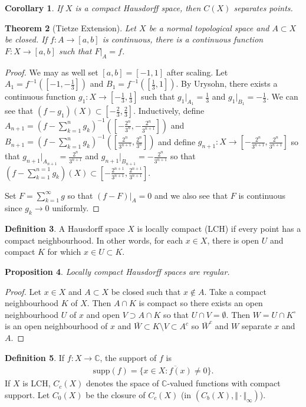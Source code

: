 \documentclass[11pt]{amsart}
\newtheorem{theorem}{Theorem}[section]
\newtheorem{proposition}[theorem]{Proposition}
\newtheorem{corollary}[theorem]{Corollary}
\theoremstyle{definition}
\newtheorem{definition}[theorem]{Definition}
\numberwithin{equation}{section}
\begin{document}
\begin{corollary}
    If $X$ is a compact Hausdorff space, then $C(X)$ separates points.
\end{corollary}
\begin{theorem}[Tietze Extension]
    Let $X$ be a normal topological space and $A\subset X$ be closed. If $f:A\to[a,b]$ is continuous, there is a continuous function $F:X\to[a,b]$ such that $F|_A=f$.
\end{theorem}
\begin{proof}
    We may as well set $[a,b]=[-1,1]$ after scaling. Let $A_1=f^{-1}([-1,-\frac{1}{3}])$ and $B_1=f^{-1}([\frac{1}{3},1])$. By Urysohn, there exists a continuous function $g_1:X\to[-\frac{1}{3},\frac{1}{3}]$ such that $g_1|_{A_1}=\frac{1}{3}$ and $g_1|_{B_1}=-\frac{1}{3}$. We can see that $(f-g_1)(X)\subset[-\frac{2}{3},\frac{2}{3}]$. Inductively, define $A_{n+1}=(f-\sum_{k=1}^ng_k)^{-1}([-\frac{2^n}{3^n},-\frac{2^n}{3^{n+1}}])$ and $B_{n+1}=(f-\sum_{k=1}^ng_k)^{-1}([\frac{2^n}{3^{n+1}},\frac{2^n}{3^{n}}])$ and define $g_{n+1}:X\to[-\frac{2^n}{3^{n+1}},\frac{2^n}{3^{n+1}}]$ so that $g_{n+1}|_{A_{n+1}}=\frac{2^n}{3^{n+1}}$ and $g_{n+1}|_{B_{n+1}}=-\frac{2^n}{3^{n+1}}$ so that $(f-\sum_{k=1}^{n=1}g_k)(X)\subset[-\frac{2^{n+1}}{3^{n+1}},\frac{2^{n+1}}{3^{n+1}}]$.

    Set $F=\sum_{k=1}^\infty g$ so that $(f-F)|_A=0$ and we also see that $F$ is continuous since $g_k\to0$ uniformly.
\end{proof}
\begin{definition}
    A Hausdorff space $X$ is locally compact (LCH) if every point has a compact neighbourhood. In other words, for each $x\in X$, there is open $U$ and compact $K$ for which $x\in U\subset K$.
\end{definition}
\begin{proposition}
    Locally compact Hausdorff spaces are regular.
\end{proposition}
\begin{proof}
    Let $x\in X$ and $A\subset X$ be closed such that $x\not\in A$. Take a compact neighbourhood $K$ of $X$. Then $A\cap K$ is compact so there exists an open neighbourhood $U$ of $x$ and open $V\supset A\cap K$ so that $U\cap V=\emptyset$. Then $W=U\cap K^\circ$ is an open neighbourhood of $x$ and $\bar W\subset K\setminus V\subset A^c$ so $\bar W^c$ and $W$ separate $x$ and $A$.
\end{proof}
\begin{definition}
    If $f:X\to\mathbb C$, the support of $f$ is 
    \begin{align*}
        \mathrm{supp}(f)=\overline{\{x\in X:f(x)\ne 0\}}.
    \end{align*}
    If $X$ is LCH, $C_c(X)$ denotes the space of $\mathbb C$-valued functions with compact support. Let $C_0(X)$ be the closure of $C_c(X)$ (in $(C_b(X),\Vert\cdot\Vert_\infty)$).
\end{definition}
\end{document}
